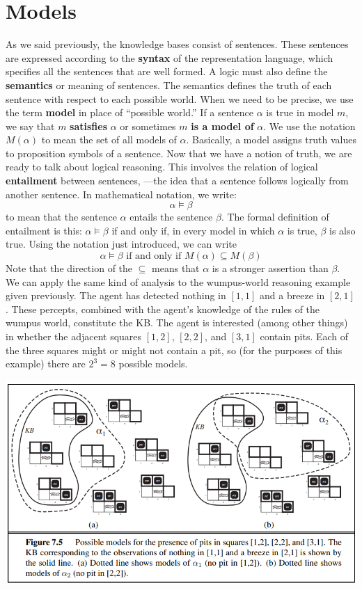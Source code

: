 \section{Models}
As we said previously, the knowledge bases consist of sentences. These sentences are expressed according to the \textbf{syntax} of the representation language, which specifies all the sentences that are well formed. A logic must also define the \textbf{semantics} or meaning of sentences. The semantics defines the truth of each sentence with respect to each possible world.\newline\newline
When we need to be precise, we use the term \textbf{model} in place of “possible world.”  If a sentence $\alpha$ is true in model $m$, we say that $m$ \textbf{satisfies} $\alpha$ or sometimes $m$ \textbf{is a model of} $\alpha$. We use the notation $M(\alpha)$ to mean the set of all models of $\alpha$. Basically, a model assigns truth values to proposition symbols of a sentence.\newline\newline
Now that we have a notion of truth, we are ready to talk about logical reasoning. This involves the relation of logical \textbf{entailment} between sentences, —the idea that a sentence follows logically from another sentence. In mathematical notation, we write:
\[\alpha \vDash \beta\]
to mean that the sentence $\alpha$ entails the sentence $\beta$. The formal definition of entailment is this: $\alpha \vDash \beta$ if and only if, in every model in which $\alpha$ is true, $\beta$ is also true. Using the notation just introduced, we can write
\[\alpha \vDash \beta\,\, \text{if and only if } M(\alpha) \subseteq M(\beta)\]
Note that the direction of the $\subseteq$ means that $\alpha$ is a stronger assertion than $\beta$.\newline\newline
We can apply the same kind of analysis to the wumpus-world reasoning example given previously. The agent has detected nothing in $[1,1]$ and a breeze in $[2,1]$. These percepts, combined with the agent’s knowledge
of the rules of the wumpus world, constitute the KB. The agent is interested (among other things) in whether the adjacent squares $[1,2]$, $[2,2]$, and $[3,1]$ contain pits. Each of the three squares might or might not contain a pit, so (for the purposes of this example) there are $2^3 = 8$ possible models.
\begin{center}
    \includegraphics[scale=0.8]{images/kb-wumpus.png}
\end{center}
